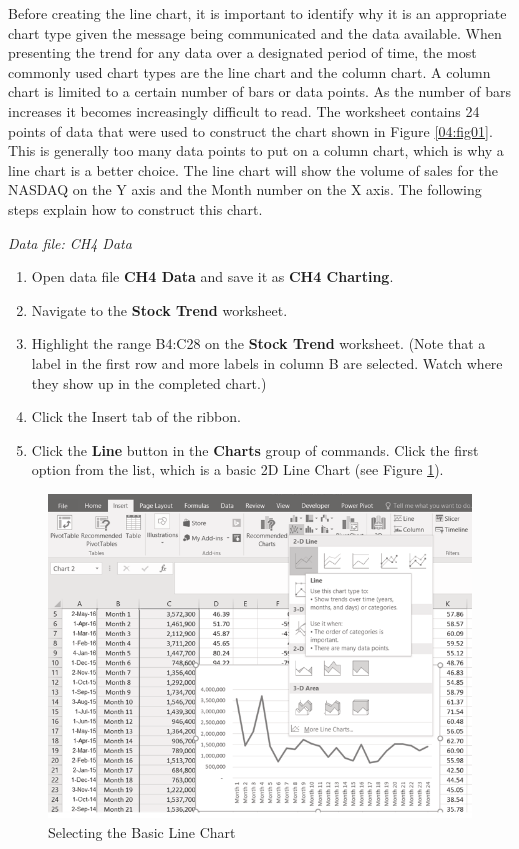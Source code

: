 Before creating the line chart, it is important to identify why it is an appropriate chart type given the message being communicated and the data available. When presenting the trend for any data over a designated period of time, the most commonly used chart types are the line chart and the column chart. A column chart is limited to a certain number of bars or data points. As the number of bars increases it becomes increasingly difficult to read. The worksheet contains 24 points of data that were used to construct the chart shown in Figure \ref{04:fig01}. This is generally too many data points to put on a column chart, which is why a line chart is a better choice. The line chart will show the volume of sales for the NASDAQ on the Y axis and the Month number on the X axis. The following steps explain how to construct this chart.

\textit{Data file: CH4 Data}

\begin{enumerate}
	\item Open data file \textbf{CH4 Data} and save it as \textbf{CH4 Charting}.
	\item Navigate to the \textbf{Stock Trend} worksheet.
	\item Highlight the range \textsf{B4:C28} on the \textbf{Stock Trend} worksheet. (Note that a label in the first row and more labels in column B are selected. Watch where they show up in the completed chart.)
	\item Click the Insert tab of the ribbon.
	\item Click the \textbf{Line} button in the \textbf{Charts} group of commands. Click the first option from the list, which is a basic 2D Line Chart (see Figure \ref{04:fig02}).
\end{enumerate}

\begin{figure}[H]
	\centering
	\includegraphics[width=\maxwidth{.95\linewidth}]{gfx/ch04_fig02}
	\caption{Selecting the Basic Line Chart}
	\label{04:fig02}
\end{figure}

